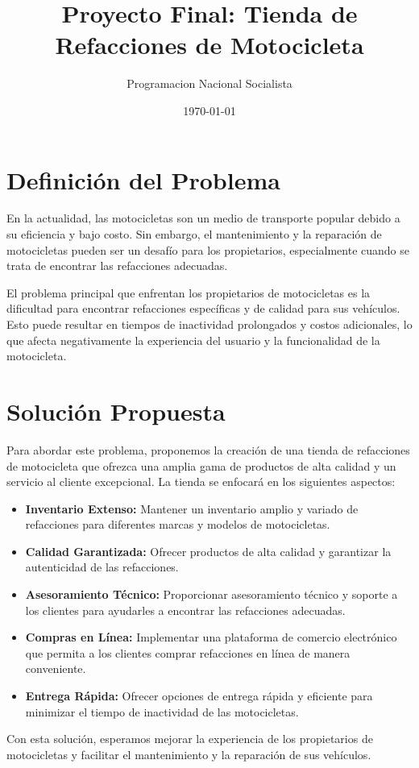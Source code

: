 \documentclass{article}
\title{Proyecto Final: Tienda de Refacciones de Motocicleta}
\author{Programacion Nacional Socialista}
\date{\today}
\begin{document}
\maketitle

\section{Definición del Problema}

En la actualidad, las motocicletas son un medio de transporte popular debido a su eficiencia y bajo costo. Sin embargo, el mantenimiento y la reparación de motocicletas pueden ser un desafío para los propietarios, especialmente cuando se trata de encontrar las refacciones adecuadas. 

El problema principal que enfrentan los propietarios de motocicletas es la dificultad para encontrar refacciones específicas y de calidad para sus vehículos. Esto puede resultar en tiempos de inactividad prolongados y costos adicionales, lo que afecta negativamente la experiencia del usuario y la funcionalidad de la motocicleta.

\section{Solución Propuesta}

Para abordar este problema, proponemos la creación de una tienda de refacciones de motocicleta que ofrezca una amplia gama de productos de alta calidad y un servicio al cliente excepcional. 
La tienda se enfocará en los siguientes aspectos:

\begin{itemize}
    \item \textbf{Inventario Extenso:} Mantener un inventario amplio y variado de refacciones para diferentes marcas y modelos de motocicletas.
    \item \textbf{Calidad Garantizada:} Ofrecer productos de alta calidad y garantizar la autenticidad de las refacciones.
    \item \textbf{Asesoramiento Técnico:} Proporcionar asesoramiento técnico y soporte a los clientes para ayudarles a encontrar las refacciones adecuadas.
    \item \textbf{Compras en Línea:} Implementar una plataforma de comercio electrónico que permita a los clientes comprar refacciones en línea de manera conveniente.
    \item \textbf{Entrega Rápida:} Ofrecer opciones de entrega rápida y eficiente para minimizar el tiempo de inactividad de las motocicletas.
\end{itemize}

Con esta solución, esperamos mejorar la experiencia de los propietarios de motocicletas y facilitar el mantenimiento y la reparación de sus vehículos.
\end{document}
